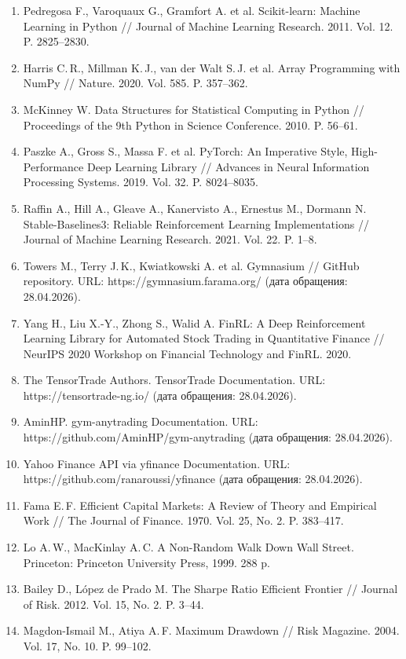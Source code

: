 \begin{enumerate}[leftmargin=1cm,label=\arabic*.]
\item Pedregosa F., Varoquaux G., Gramfort A. et al. Scikit-learn: Machine Learning in Python // Journal of Machine Learning Research. 2011. Vol. 12. P. 2825--2830.
\item Harris C.\,R., Millman K.\,J., van der Walt S.\,J. et al. Array Programming with NumPy // Nature. 2020. Vol. 585. P. 357--362.
\item McKinney W. Data Structures for Statistical Computing in Python // Proceedings of the 9th Python in Science Conference. 2010. P. 56--61.
\item Paszke A., Gross S., Massa F. et al. PyTorch: An Imperative Style, High-Performance Deep Learning Library // Advances in Neural Information Processing Systems. 2019. Vol. 32. P. 8024--8035.
\item Raffin A., Hill A., Gleave A., Kanervisto A., Ernestus M., Dormann N. Stable-Baselines3: Reliable Reinforcement Learning Implementations // Journal of Machine Learning Research. 2021. Vol. 22. P. 1--8.
\item Towers M., Terry J.\,K., Kwiatkowski A. et al. Gymnasium // GitHub repository. URL: https://gymnasium.farama.org/ (дата обращения: 28.04.2026).
\item Yang H., Liu X.-Y., Zhong S., Walid A. FinRL: A Deep Reinforcement Learning Library for Automated Stock Trading in Quantitative Finance // NeurIPS 2020 Workshop on Financial Technology and FinRL. 2020.
\item The TensorTrade Authors. TensorTrade Documentation. URL: https://tensortrade-ng.io/ (дата обращения: 28.04.2026).
\item AminHP. gym-anytrading Documentation. URL: https://github.com/AminHP/gym-anytrading (дата обращения: 28.04.2026).
\item Yahoo Finance API via yfinance Documentation. URL: https://github.com/ranaroussi/yfinance (дата обращения: 28.04.2026).
\item Fama E.\,F. Efficient Capital Markets: A Review of Theory and Empirical Work // The Journal of Finance. 1970. Vol. 25, No. 2. P. 383--417.
\item Lo A.\,W., MacKinlay A.\,C. A Non-Random Walk Down Wall Street. Princeton: Princeton University Press, 1999. 288 p.
\item Bailey D., López de Prado M. The Sharpe Ratio Efficient Frontier // Journal of Risk. 2012. Vol. 15, No. 2. P. 3--44.
\item Magdon-Ismail M., Atiya A.\,F. Maximum Drawdown // Risk Magazine. 2004. Vol. 17, No. 10. P. 99--102.
\end{enumerate}
